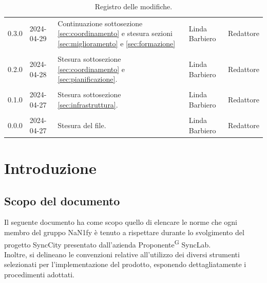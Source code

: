 \documentclass[8pt]{article}
\newcommand{\glossterm}[1]{#1\textsuperscript{G}} %
\begin{document}
\begin{table}[ht!]
\begin{tabular}{p{1.2cm} p{2cm} p{6cm} p{3cm} p{2cm}}
		0.3.0 & 2024-04-29 & Continuazione sottosezione \ref{sec:coordinamento} e
      stesura sezioni \ref{sec:miglioramento} e \ref{sec:formazione} & Linda Barbiero & Redattore \\\\ %
      0.2.0 & 2024-04-28 & Stesura sottosezione \ref{sec:coordinamento} e \ref{sec:pianificazione}. & Linda Barbiero & Redattore \\\\ %
      0.1.0 & 2024-04-27 & Stesura sottosezione \ref{sec:infrastruttura}. & Linda Barbiero & Redattore \\\\ %
		0.0.0 & 2024-04-27 & Stesura del file. & Linda Barbiero & Redattore \\ %
		\bottomrule
	\end{tabular}
	\caption{Registro delle modifiche.}
	\label{table:Registro delle modifiche}
\end{table}
\newpage
{\hypersetup{hidelinks} \tableofcontents}
\clearpage
\newpage
{\hypersetup{hidelinks} \listoffigures}
\newpage
{\hypersetup{hidelinks} \listoftables}
\newpage
\justifying
\section{Introduzione} \label{sec:intro}
\subsection{Scopo del documento}
Il seguente documento ha come scopo quello di elencare le norme che ogni membro del gruppo NaN1fy è
tenuto a rispettare durante lo svolgimento del progetto SyncCity presentato dall'azienda
\glossterm{Proponente} SyncLab.\\
Inoltre, si delineano le convenzioni relative all'utilizzo dei diversi strumenti selezionati per l'implementazione del prodotto, esponendo dettagliatamente i procedimenti adottati.
\end{document}
